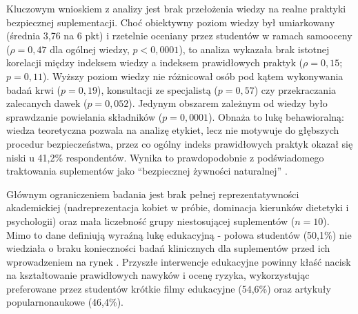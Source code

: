 Kluczowym wnioskiem z analizy jest brak przełożenia wiedzy na realne praktyki bezpiecznej suplementacji. Choć obiektywny poziom wiedzy był umiarkowany (średnia 3,76 na 6 pkt) i rzetelnie oceniany przez studentów w ramach samooceny ($\rho = 0,47$ dla ogólnej wiedzy, $p < 0,0001$), to analiza wykazała brak istotnej korelacji między indeksem wiedzy a indeksem prawidłowych praktyk ($\rho = 0,15$; $p = 0,11$). Wyższy poziom wiedzy nie różnicował osób pod kątem wykonywania badań krwi ($p = 0,19$), konsultacji ze specjalistą ($p = 0,57$) czy przekraczania zalecanych dawek ($p = 0,052$). Jedynym obszarem zależnym od wiedzy było sprawdzanie powielania składników ($p = 0,0001$). Obnaża to lukę behawioralną: wiedza teoretyczna pozwala na analizę etykiet, lecz nie motywuje do głębszych procedur bezpieczeństwa, przez co ogólny indeks prawidłowych praktyk okazał się niski u 41,2\% respondentów. Wynika to prawdopodobnie z podświadomego traktowania suplementów jako \enquote{bezpiecznej żywności naturalnej} \cite{chiba2020educational}.

Głównym ograniczeniem badania jest brak pełnej reprezentatywności akademickiej (nadreprezentacja kobiet w próbie, dominacja kierunków dietetyki i psychologii) oraz mała liczebność grupy niestosującej suplementów ($n = 10$). Mimo to dane definiują wyraźną lukę edukacyjną - połowa studentów (50,1\%) nie wiedziała o braku konieczności badań klinicznych dla suplementów przed ich wprowadzeniem na rynek \cite{homan2018dietary}. Przyszłe interwencje edukacyjne powinny kłaść nacisk na kształtowanie prawidłowych nawyków i ocenę ryzyka, wykorzystując preferowane przez studentów krótkie filmy edukacyjne (54,6\%) oraz artykuły popularnonaukowe (46,4\%).

